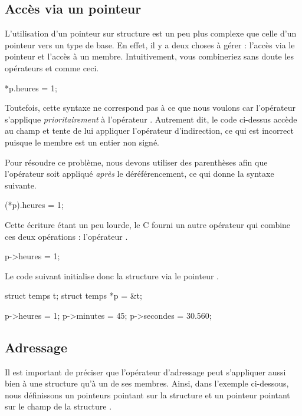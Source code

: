 \subsection{Accès via un pointeur}
\label{acces-via-un-pointeur}

L'utilisation d'un pointeur sur structure est un peu plus complexe que
celle d'un pointeur vers un type de base. En effet, il y a deux choses à
gérer : l'accès via le pointeur et l'accès à un membre. Intuitivement,
vous combineriez sans doute les opérateurs \mybox{*} et 
comme ceci.

\begin{C}
*p.heures = 1;
\end{C}

Toutefois, cette syntaxe ne correspond pas à ce que nous voulons car
l'opérateur  s'applique \emph{prioritairement} à l'opérateur
\mybox{*}. Autrement dit, le code ci-dessus accède au champ
 et tente de lui appliquer l'opérateur d'indirection, ce
qui est incorrect puisque le membre  est un entier non
signé.

Pour résoudre ce problème, nous devons utiliser des parenthèses afin que
l'opérateur  soit appliqué \emph{après} le déréférencement, ce
qui donne la syntaxe suivante.

\begin{C}
(*p).heures = 1;
\end{C}

Cette écriture étant un peu lourde, le C fourni un autre opérateur qui
combine ces deux opérations : l'opérateur \mybox{-\textgreater{}}.

\begin{C}
p->heures = 1;
\end{C}

Le code suivant initialise donc la structure  via le pointeur
.

\begin{C}
struct temps t;
struct temps *p = &t;

p->heures = 1;
p->minutes = 45;
p->secondes = 30.560;

\end{C}

\subsection{Adressage}
\label{adressage}

Il est important de préciser que l'opérateur d'adressage peut
s'appliquer aussi bien à une structure qu'à un de ses membres. Ainsi,
dans l'exemple ci-dessous, nous définissons un pointeurs 
pointant sur la structure  et un pointeur  pointant
sur le champ  de la structure .

